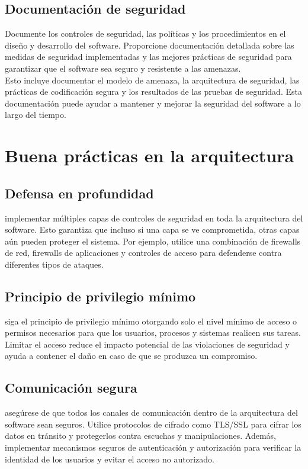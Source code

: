 \documentclass{article}
\begin{document}
\subsection{Documentación de seguridad}
Documente los controles de seguridad, las políticas y los procedimientos en el diseño y desarrollo del software. Proporcione documentación detallada sobre las medidas de seguridad implementadas y las mejores prácticas de seguridad para garantizar que el software sea seguro y resistente a las amenazas.
\vspace{0.25cm}\\
Esto incluye documentar el modelo de amenaza, la arquitectura de seguridad, las prácticas de codificación segura y los resultados de las pruebas de seguridad. Esta documentación puede ayudar a mantener y mejorar la seguridad del software a lo largo del tiempo.
\section{Buena prácticas en la arquitectura}
\subsection{Defensa en profundidad}
implementar múltiples capas de controles de seguridad en toda la arquitectura del software. Esto garantiza que incluso si una capa se ve comprometida, otras capas aún pueden proteger el sistema. Por ejemplo, utilice una combinación de firewalls de red, firewalls de aplicaciones y controles de acceso para defenderse contra diferentes tipos de ataques.
\subsection{Principio de privilegio mínimo}
siga el principio de privilegio mínimo otorgando solo el nivel mínimo de acceso o permisos necesarios para que los usuarios, procesos y sistemas realicen sus tareas. Limitar el acceso reduce el impacto potencial de las violaciones de seguridad y ayuda a contener el daño en caso de que se produzca un compromiso.
\subsection{Comunicación segura}
asegúrese de que todos los canales de comunicación dentro de la arquitectura del software sean seguros. Utilice protocolos de cifrado como TLS/SSL para cifrar los datos en tránsito y protegerlos contra escuchas y manipulaciones. Además, implementar mecanismos seguros de autenticación y autorización para verificar la identidad de los usuarios y evitar el acceso no autorizado.
\end{document}

